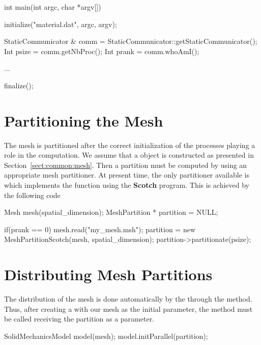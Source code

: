 \begin{cpp}
int main(int argc, char *argv[])
{
  initialize("material.dat", argc, argv);

  StaticCommunicator & comm = StaticCommunicator::getStaticCommunicator();
  Int psize = comm.getNbProc();
  Int prank = comm.whoAmI();

  ...

  finalize();
}
\end{cpp}

\section{Partitioning the Mesh}

The mesh is partitioned after the correct initialization of the
processes playing a role in the computation. We assume that a
 object is constructed as presented in
Section~\ref{sect:common:mesh}.  Then a partition must be computed by
using an appropriate mesh partitioner. At present time, the only
partitioner available is  which implements
the function  using the
\textbf{Scotch}\cite{scotch} program.  This is achieved by the
following code

\begin{cpp}
  Mesh mesh(spatial_dimension);
  MeshPartition * partition = NULL;

  if(prank == 0) {
    mesh.read("my_mesh.msh");
    partition = new MeshPartitionScotch(mesh, spatial_dimension);
    partition->partitionate(psize);
  }
\end{cpp}


\section{Distributing Mesh Partitions}

The distribution of the mesh is done automatically by the
 through the  method.  Thus,
after creating a  with our mesh as the initial
parameter, the  method must be called receiving the partition
as a parameter.

\begin{cpp}
  SolidMechanicsModel model(mesh);
  model.initParallel(partition);
\end{cpp}

